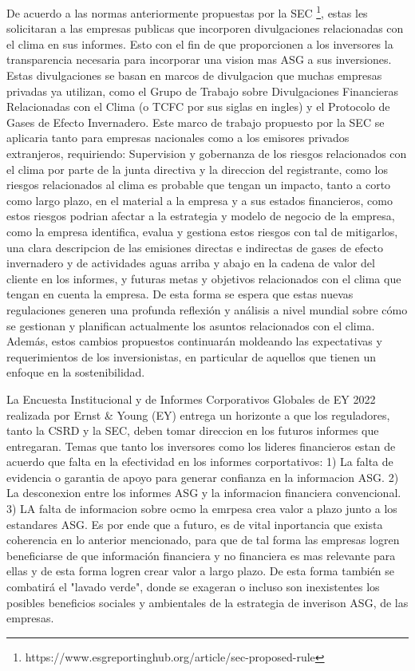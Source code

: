 \vspace{0.5cm}

De acuerdo a las normas anteriormente propuestas por la SEC \footnote{https://www.esgreportinghub.org/article/sec-proposed-rule}, estas les solicitaran a las empresas publicas que incorporen divulgaciones relacionadas con el clima en sus informes. Esto con el fin de que proporcionen a los inversores la transparencia necesaria para incorporar una vision mas ASG a sus inversiones. Estas divulgaciones se basan en marcos de divulgacion que muchas empresas privadas ya utilizan, como el Grupo de Trabajo sobre Divulgaciones Financieras Relacionadas con el Clima (o TCFC por sus siglas en ingles) y el Protocolo de Gases de Efecto Invernadero. Este marco de trabajo propuesto por la SEC se aplicaria tanto para empresas nacionales como a los emisores privados extranjeros, requiriendo: Supervision y gobernanza de los riesgos relacionados con el clima por parte de la junta directiva y la direccion del registrante, como los riesgos relacionados al clima es probable que tengan un impacto, tanto a corto como largo plazo, en el material a la empresa y a sus estados financieros, como estos riesgos podrian afectar a la estrategia y modelo de negocio de la empresa, como la empresa identifica, evalua y gestiona estos riesgos con tal de mitigarlos, una clara descripcion de las emisiones directas e indirectas de gases de efecto invernadero y de actividades aguas arriba y abajo en la cadena de valor del cliente en los informes, y futuras metas y objetivos relacionados con el clima que tengan en cuenta la empresa. De esta forma se espera que estas nuevas regulaciones generen una profunda reflexión y análisis a nivel mundial sobre cómo se gestionan y planifican actualmente los asuntos relacionados con el clima. Además, estos cambios propuestos continuarán moldeando las expectativas y requerimientos de los inversionistas, en particular de aquellos que tienen un enfoque en la sostenibilidad.

\vspace{0.5cm}

La Encuesta Institucional y de Informes Corporativos Globales de EY 2022 realizada por Ernst \& Young (EY) entrega un horizonte a que los reguladores, tanto la CSRD y la SEC, deben tomar direccion en los futuros informes que entregaran. Temas que tanto los inversores como los lideres financieros estan de acuerdo que falta en la efectividad en los informes corportativos: 1) La falta de evidencia o garantia de apoyo para generar confianza en la informacion ASG. 2) La desconexion entre los informes ASG y la informacion financiera convencional. 3) LA falta de informacion sobre ocmo la emrpesa crea valor a plazo junto a los estandares ASG. Es por ende que a futuro, es de vital inportancia que exista coherencia en lo anterior mencionado, para que de tal forma las empresas logren beneficiarse de que información financiera y no financiera es mas relevante para ellas y de esta forma logren crear valor a largo plazo. De esta forma también se combatirá el "lavado verde", donde se exageran o incluso son inexistentes los posibles beneficios sociales y ambientales de la estrategia de inverison ASG, de las empresas.


